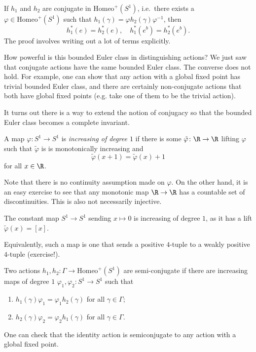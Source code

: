 \documentclass[a4paper]{article}
\newcommand\Homeo{\mathrm{Homeo}}
\begin{document}
\begin{ex}
  If $h_1$ and $h_2$ are conjugate in $\Homeo^+(S^1)$, i.e.\ there exists a $\varphi \in \Homeo^+(S^1)$ such that $h_1(\gamma) = \varphi h_2(\gamma) \varphi^{-1}$, then
  \[
    h_1^*(e) = h_2^*(e),\quad h_1^*(e^b) = h_2^*(e^b).
  \]
  The proof involves writing out a lot of terms explicitly.
\end{ex}

How powerful is this bounded Euler class in distinguishing actions? We just saw that conjugate actions have the same bounded Euler class. The converse does not hold. For example, one can show that any action with a global fixed point has trivial bounded Euler class, and there are certainly non-conjugate actions that both have global fixed points (e.g. take one of them to be the trivial action).

It turns out there is a way to extend the notion of conjugacy so that the bounded Euler class becomes a complete invariant.

\begin{defi}
  A map $\varphi\colon S^1 \to S^1$ is \emph{increasing of degree $1$} if there is some $\tilde{\varphi}\colon \R \to \R$ lifting $\varphi$ such that $\tilde{\varphi}$ is is monotonically increasing and
  \[
    \tilde{\varphi}(x + 1) = \tilde{\varphi}(x) + 1
  \]
  for all $x \in \R$.
\end{defi}
Note that there is no continuity assumption made on $\varphi$. On the other hand, it is an easy exercise to see that any monotonic map $\R \to \R$ has a countable set of discontinuities. This is also not necessarily injective.

\begin{eg}
  The constant map $S^1 \to S^1$ sending $x \mapsto 0$ is increasing of degree $1$, as it has a lift $\tilde{\varphi}(x) = [x]$.
\end{eg}

Equivalently, such a map is one that sends a positive $4$-tuple to a weakly positive $4$-tuple (exercise!). %

\begin{defi}
  Two actions $h_1, h_2\colon \Gamma \to \Homeo^+(S^1)$ are semi-conjugate if there are increasing maps of degree $1$ $\varphi_1, \varphi_2\colon S^1 \to S^1$ such that
  \begin{enumerate}
    \item $h_1(\gamma) \varphi_1 = \varphi_1 h_2(\gamma)$ for all $\gamma \in \Gamma$;
    \item $h_2(\gamma) \varphi_2 = \varphi_2 h_1(\gamma)$ for all $\gamma \in \Gamma$.
  \end{enumerate}
\end{defi}
One can check that the identity action is semiconjugate to any action with a global fixed point.
\end{document}
